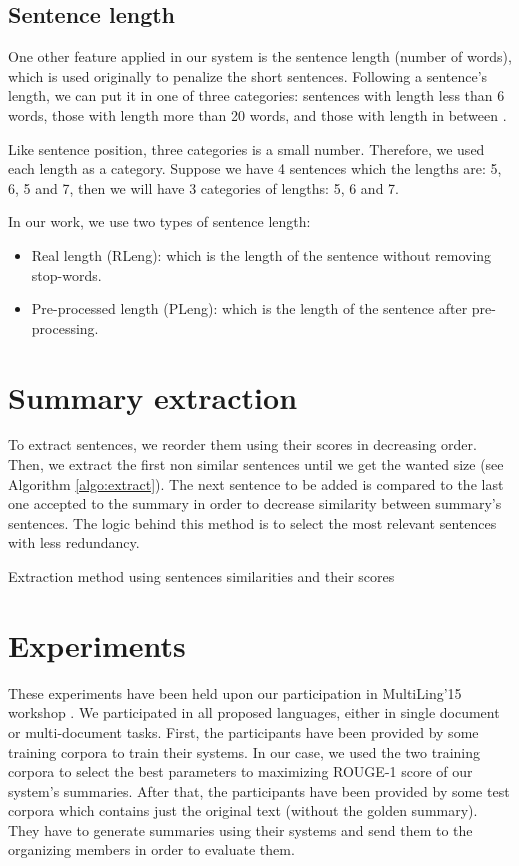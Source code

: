 \subsection{Sentence length}

One other feature applied in our system is the sentence length (number of words), which is used originally to penalize the short sentences. 
Following a sentence's length, we can put it in one of three categories: sentences with length less than 6 words, those with length more than 20 words, and those with length in between \citep{02-osborne}.

Like sentence position, three categories is a small number. 
Therefore, we used each length as a category.
Suppose we have 4 sentences which the lengths are: 5, 6, 5 and 7, then we will have 3 categories of lengths: 5, 6 and 7.

In our work, we use two types of sentence length:
\begin{itemize}
	\item Real length (RLeng): which is the length of the sentence without removing stop-words.
	\item Pre-processed length (PLeng): which is the length of the sentence after pre-processing.
\end{itemize}


\section{Summary extraction}

To extract sentences, we reorder them using their scores in decreasing order.
Then, we extract the first non similar sentences until we get the wanted size (see Algorithm \ref{algo:extract}).
The next sentence to be added is compared to the last one accepted to the summary in order to decrease similarity between summary's sentences.
The logic behind this method is to select the most relevant sentences with less redundancy.

\begin{algorithm}[!ht]
	\caption{Extraction method using sentences similarities and their scores}
	\label{algo:extract}
\end{algorithm}


\section{Experiments}

These experiments have been held upon our participation in MultiLing'15 workshop \citep{15-aries-al}. 
We participated in all proposed languages, either in single document or multi-document tasks.
First, the participants have been provided by some training corpora to train their systems. 
In our case, we used the two training corpora to select the best parameters to maximizing ROUGE-1 score of our system's summaries. 
After that, the participants have been provided by some test corpora which contains just the original text (without the golden summary). 
They have to generate summaries using their systems and send them to the organizing members in order to evaluate them.

